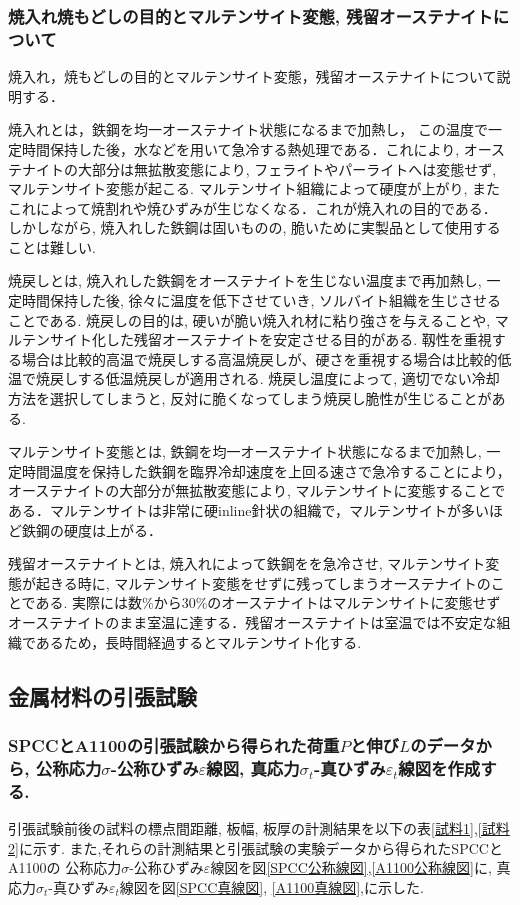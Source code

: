 \documentclass[a4paper,11pt,uplatex]{jsarticle}
\begin{document}
\subsubsection{焼入れ焼もどしの目的とマルテンサイト変態, 残留オーステナイトについて}
焼入れ，焼もどしの目的とマルテンサイト変態，残留オーステナイトについて説明する．
\par
焼入れとは，鉄鋼を均一オーステナイト状態になるまで加熱し，
この温度で一定時間保持した後，水などを用いて急冷する熱処理である．これにより, オーステナイトの大部分は無拡散変態により, フェライトやパーライトへは変態せず, マルテンサイト変態が起こる.
マルテンサイト組織によって硬度が上がり, またこれによって焼割れや焼ひずみが生じなくなる．これが焼入れの目的である．
しかしながら, 焼入れした鉄鋼は固いものの, 脆いために実製品として使用することは難しい.
\par
焼戻しとは, 焼入れした鉄鋼をオーステナイトを生じない温度まで再加熱し, 一定時間保持した後, 徐々に温度を低下させていき, ソルバイト組織を生じさせることである.
焼戻しの目的は, 硬いが脆い焼入れ材に粘り強さを与えることや, マルテンサイト化した残留オーステナイトを安定させる目的がある.
靱性を重視する場合は比較的高温で焼戻しする高温焼戻しが、硬さを重視する場合は比較的低温で焼戻しする低温焼戻しが適用される.
焼戻し温度によって, 適切でない冷却方法を選択してしまうと, 反対に脆くなってしまう焼戻し脆性が生じることがある.
\par
マルテンサイト変態とは, 鉄鋼を均一オーステナイト状態になるまで加熱し, 一定時間温度を保持した鉄鋼を臨界冷却速度を上回る速さで急冷することにより，オーステナイトの大部分が無拡散変態により,
マルテンサイトに変態することである．マルテンサイトは非常に硬inline針状の組織で，マルテンサイトが多いほど鉄鋼の硬度は上がる．
\par
残留オーステナイトとは, 焼入れによって鉄鋼をを急冷させ, マルテンサイト変態が起きる時に, マルテンサイト変態をせずに残ってしまうオーステナイトのことである.
実際には数\%から30\%のオーステナイトはマルテンサイトに変態せずオーステナイトのまま室温に達する．残留オーステナイトは室温では不安定な組織であるため，長時間経過するとマルテンサイト化する.

\subsection{金属材料の引張試験}
\subsubsection{SPCCとA1100の引張試験から得られた荷重$P$と伸び$L$のデータから, 公称応力$\sigma$-公称ひずみ$\varepsilon$線図, 真応力$\sigma_t$-真ひずみ$\varepsilon_t$線図を作成する.}
引張試験前後の試料の標点間距離, 板幅, 板厚の計測結果を以下の表\ref{試料1},\ref{試料2}に示す. また,それらの計測結果と引張試験の実験データから得られたSPCCとA1100の
公称応力$\sigma$-公称ひずみ$\varepsilon$線図を図\ref{SPCC公称線図},\ref{A1100公称線図}に, 真応力$\sigma_t$-真ひずみ$\varepsilon_t$線図を図\ref{SPCC真線図}, \ref{A1100真線図},に示した.
\end{document}
